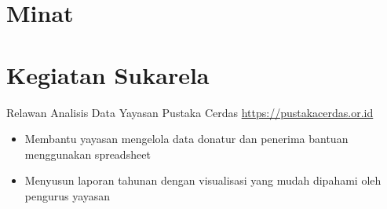 \documentclass[a4paper, serif, 10pt]{moderncv}
\begin{document}
\section{Minat}

\section{Kegiatan Sukarela}

        {Relawan Analisis Data}
        {Yayasan Pustaka Cerdas}
        {\url{https://pustakacerdas.or.id}}
        {}
        {\begin{itemize}
\item Membantu yayasan mengelola data donatur dan penerima bantuan menggunakan spreadsheet
\item Menyusun laporan tahunan dengan visualisasi yang mudah dipahami oleh pengurus yayasan
\end{itemize}}
    
\end{document}
